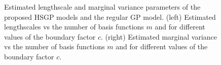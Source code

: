 \documentclass[]{interact}
\theoremstyle{plain}%
\theoremstyle{definition}
\theoremstyle{remark}
\begin{document}
\begin{figure}
\centering
{}
\caption{Estimated lengthscale and marginal variance parameters of the proposed HSGP models and the regular GP model. (left) Estimated lengthscales vs the number of basis functions $m$ and for different values of the boundary factor $c$. (right) Estimated marginal variance vs the number of basis functions $m$ and for different values of the boundary factor $c$.}
  \label{fig6_lscale_vs_J}
\end{figure}
\end{document}
